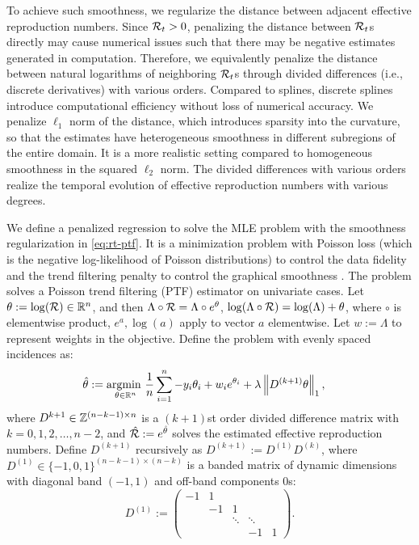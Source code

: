 To achieve such smoothness, we regularize the distance between adjacent
effective reproduction numbers. Since $\mathcal{R}_t > 0$, penalizing the distance
between $\mathcal{R}_t$s directly may cause numerical issues such that there may be
negative estimates generated in computation. Therefore, we equivalently penalize
the distance between natural logarithms of neighboring $\mathcal{R}_t$s through
divided differences (i.e., discrete derivatives) with various orders.  
Compared to splines, discrete splines introduce computational efficiency without
loss of numerical accuracy. We penalize $\ell_1$ norm of the distance, which
introduces sparsity into the curvature, so that the estimates have heterogeneous
smoothness in different subregions of the entire domain. It is a more realistic
setting compared to homogeneous smoothness in the squared $\ell_2$ norm. The
divided differences with various orders realize the temporal evolution of
effective reproduction numbers with various degrees. 

We define a penalized regression to solve the MLE problem with the smoothness
regularization in \eqref{eq:rt-ptf}. It is a minimization problem with Poisson
loss (which is the negative log-likelihood of Poisson distributions) to control
the data fidelity and the trend filtering penalty to control the graphical
smoothness \citep{kim2009ell_1,tibshirani2014adaptive,tibshirani2022divided}.
The problem solves a Poisson trend filtering (PTF) estimator on univariate
cases. Let $\theta := \log(\mathcal{R}) \in \mathbb{R}^n$, and then $\Lambda\circ \mathcal{R} =
\Lambda\circ e^{\theta}$, $\log(\Lambda\circ \mathcal{R}) = \log(\Lambda) + \theta$,
where $\circ$ is elementwise product, $e^{a}, \log(a)$ apply to vector $a$
elementwise. Let $w:=\Lambda$ to represent weights in the objective. Define the
problem with evenly spaced incidences as: 
\begin{equation} \label{eq:rt-ptf}
    \begin{split}
        \hat{\theta} &:= \underset{\theta\in\mathbb{R}^n}{\operatorname*{argmin}\ } \frac{1}{n}\sum_{i=1}^n -y_i \theta_i + w_i e^{\theta_i} + \lambda \left\lVert D^{(k+1)} \theta \right\rVert_1,         
    \end{split}
\end{equation}
where $D^{k+1} \in \mathbb{Z}^{(n-k-1)\times n}$ is a $(k+1)$st order divided difference matrix with $k = 0,1,2,\dots, n-2$, and $\hat{\mathcal{R}} := e^{\hat{\theta}}$ solves the estimated effective reproduction numbers. Define $D^{(k+1)}$ recursively as $D^{(k+1)} := D^{(1)} D^{(k)}$, where $D^{(1)} \in \{-1,0,1\}^{(n-k-1)\times (n-k)}$ is a banded matrix of dynamic dimensions with diagonal band $(-1,1)$ and off-band components $0$s: 
$$D^{(1)} := 
\begin{pmatrix}
-1 & 1 &  & & \\
 & -1 & 1 & & \\
 & & \ddots & \ddots & \\
 & & & -1 & 1
\end{pmatrix}.
$$ 

